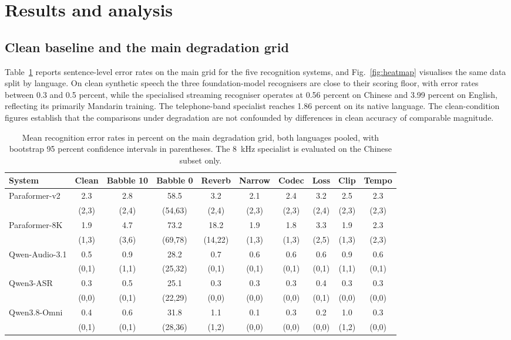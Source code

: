 \section{Results and analysis}
\label{sec:results}

\subsection{Clean baseline and the main degradation grid}
\label{sec:results:main}

Table~\ref{tab:main} reports sentence-level error rates on the main grid for
the five recognition systems, and Fig.~\ref{fig:heatmap} visualises the same
data split by language. On clean synthetic speech the three foundation-model
recognisers are close to their scoring floor, with error rates between 0.3
and 0.5 percent, while the specialised streaming recogniser operates at 0.56
percent on Chinese and 3.99 percent on English, reflecting its primarily
Mandarin training. The telephone-band specialist reaches 1.86 percent on its
native language. The clean-condition figures establish that the comparisons
under degradation are not confounded by differences in clean accuracy of
comparable magnitude.

\begin{table}[t]
\centering
\caption{Mean recognition error rates in percent on the main degradation
grid, both languages pooled, with bootstrap 95 percent confidence intervals
in parentheses. The 8~kHz specialist is evaluated on the Chinese subset only.}
\label{tab:main}
\footnotesize
\setlength{\tabcolsep}{2.6pt}
\begin{tabular}{lccccccccc}
\toprule
System & Clean & Babble 10 & Babble 0 & Reverb & Narrow & Codec & Loss & Clip & Tempo \\
\midrule
Paraformer-v2 & 2.3 & 2.8 & 58.5 & 3.2 & 2.1 & 2.4 & 3.2 & 2.5 & 2.3 \\
 & (2,3) & (2,4) & (54,63) & (2,4) & (2,3) & (2,3) & (2,4) & (2,3) & (2,3) \\
Paraformer-8K & 1.9 & 4.7 & 73.2 & 18.2 & 1.9 & 1.8 & 3.3 & 1.9 & 2.3 \\
 & (1,3) & (3,6) & (69,78) & (14,22) & (1,3) & (1,3) & (2,5) & (1,3) & (2,3) \\
Qwen-Audio-3.1 & 0.5 & 0.9 & 28.2 & 0.7 & 0.6 & 0.6 & 0.6 & 0.9 & 0.6 \\
 & (0,1) & (1,1) & (25,32) & (0,1) & (0,1) & (0,1) & (0,1) & (1,1) & (0,1) \\
Qwen3-ASR & 0.3 & 0.5 & 25.1 & 0.3 & 0.3 & 0.3 & 0.4 & 0.3 & 0.3 \\
 & (0,0) & (0,1) & (22,29) & (0,0) & (0,0) & (0,0) & (0,1) & (0,0) & (0,0) \\
Qwen3.8-Omni & 0.4 & 0.6 & 31.8 & 1.1 & 0.1 & 0.3 & 0.2 & 1.0 & 0.3 \\
 & (0,1) & (0,1) & (28,36) & (1,2) & (0,0) & (0,0) & (0,0) & (1,2) & (0,0) \\
\bottomrule
\end{tabular}
\end{table}


